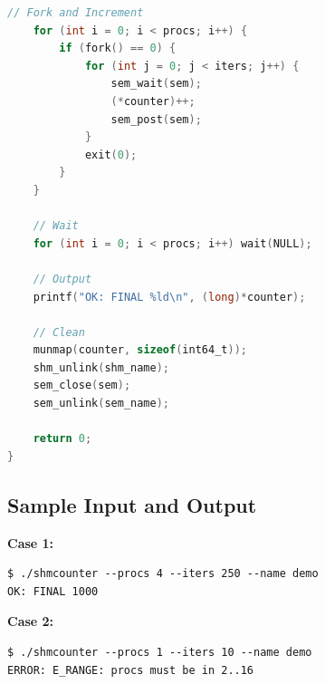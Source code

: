 \begin{lstlisting}[language=C, caption={shmcounter.c}]
    // Fork and Increment
    for (int i = 0; i < procs; i++) {
        if (fork() == 0) {
            for (int j = 0; j < iters; j++) {
                sem_wait(sem);
                (*counter)++;
                sem_post(sem);
            }
            exit(0);
        }
    }

    // Wait
    for (int i = 0; i < procs; i++) wait(NULL);

    // Output
    printf("OK: FINAL %ld\n", (long)*counter);

    // Clean
    munmap(counter, sizeof(int64_t));
    shm_unlink(shm_name);
    sem_close(sem);
    sem_unlink(sem_name);

    return 0;
}
\end{lstlisting}

\subsection{Sample Input and Output}

\textbf{Case 1:}
\begin{verbatim}
$ ./shmcounter --procs 4 --iters 250 --name demo
OK: FINAL 1000
\end{verbatim}

\textbf{Case 2:}
\begin{verbatim}
$ ./shmcounter --procs 1 --iters 10 --name demo
ERROR: E_RANGE: procs must be in 2..16
\end{verbatim}